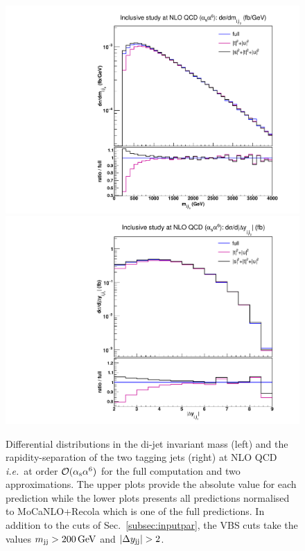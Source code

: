 \begin{figure}[hbt]
\centering
{\includegraphics[scale=0.35]{figures/scanfigures/mjj_nlo.pdf}}
{\includegraphics[scale=0.35]{figures/scanfigures/dyjj_nlo.pdf}}
\caption{
Differential distributions in the di-jet invariant mass (left) and the rapidity-separation of the two tagging jets (right) at NLO QCD \emph{i.e.}\ at order $\mathcal{O}(\alpha_\text{s}\alpha^6)$ for the full computation and two approximations.
The upper plots provide the absolute value for each prediction while the lower plots presents all predictions normalised to {\sc MoCaNLO}+{\sc Recola} which is one of the full predictions.
In addition to the cuts of Sec.~\ref{subsec:inputpar}, the VBS cuts take the values $m_{\text{j}\text{j}}>200 \,\text{GeV}$ and $|\Delta y_{\Pj\Pj}|>2$.} 
\label{fig:mjjdyjj_1d_1}
\end{figure}


